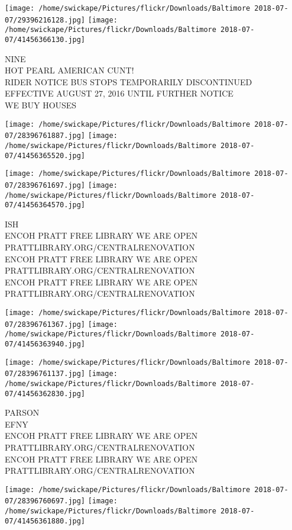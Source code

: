 \documentclass[10pt,letterpaper]{article}
\begin{document}
\texttt{[image: /home/swickape/Pictures/flickr/Downloads/Baltimore 2018-07-07/29396216128.jpg]}
\texttt{[image: /home/swickape/Pictures/flickr/Downloads/Baltimore 2018-07-07/41456366130.jpg]}

NINE\\
HOT PEARL AMERICAN CUNT!\\
RIDER NOTICE BUS STOPS TEMPORARILY DISCONTINUED EFFECTIVE AUGUST 27, 2016 UNTIL FURTHER NOTICE\\
WE BUY HOUSES
\pagebreak

\texttt{[image: /home/swickape/Pictures/flickr/Downloads/Baltimore 2018-07-07/28396761887.jpg]}
\texttt{[image: /home/swickape/Pictures/flickr/Downloads/Baltimore 2018-07-07/41456365520.jpg]}

\texttt{[image: /home/swickape/Pictures/flickr/Downloads/Baltimore 2018-07-07/28396761697.jpg]}
\texttt{[image: /home/swickape/Pictures/flickr/Downloads/Baltimore 2018-07-07/41456364570.jpg]}

ISH\\
ENCOH PRATT FREE LIBRARY WE ARE OPEN PRATTLIBRARY.ORG/CENTRALRENOVATION\\
ENCOH PRATT FREE LIBRARY WE ARE OPEN PRATTLIBRARY.ORG/CENTRALRENOVATION\\
ENCOH PRATT FREE LIBRARY WE ARE OPEN PRATTLIBRARY.ORG/CENTRALRENOVATION
\pagebreak

\texttt{[image: /home/swickape/Pictures/flickr/Downloads/Baltimore 2018-07-07/28396761367.jpg]}
\texttt{[image: /home/swickape/Pictures/flickr/Downloads/Baltimore 2018-07-07/41456363940.jpg]}

\texttt{[image: /home/swickape/Pictures/flickr/Downloads/Baltimore 2018-07-07/28396761137.jpg]}
\texttt{[image: /home/swickape/Pictures/flickr/Downloads/Baltimore 2018-07-07/41456362830.jpg]}

PARSON\\
EFNY\\
ENCOH PRATT FREE LIBRARY WE ARE OPEN PRATTLIBRARY.ORG/CENTRALRENOVATION\\
ENCOH PRATT FREE LIBRARY WE ARE OPEN PRATTLIBRARY.ORG/CENTRALRENOVATION
\pagebreak

\texttt{[image: /home/swickape/Pictures/flickr/Downloads/Baltimore 2018-07-07/28396760697.jpg]}
\texttt{[image: /home/swickape/Pictures/flickr/Downloads/Baltimore 2018-07-07/41456361880.jpg]}
\end{document}
